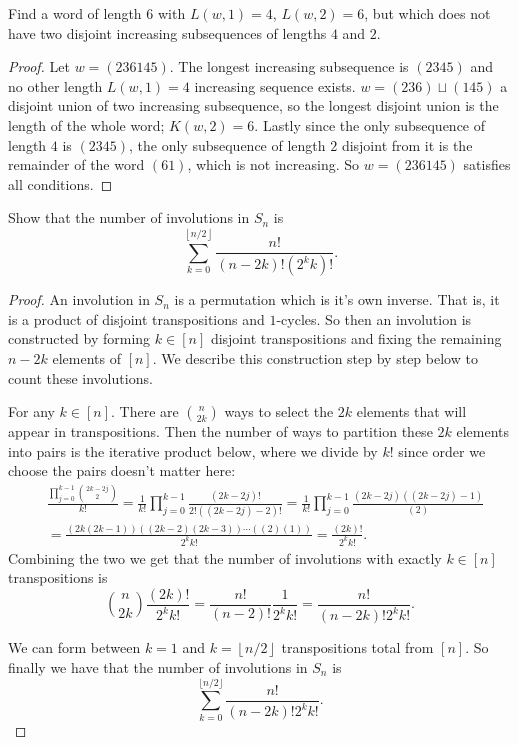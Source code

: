 \documentclass[addpoints,10pt]{exam}
\theoremstyle{plain}
\theoremstyle{definition}
\newtheorem{prob}[thm]{Problem}
\theoremstyle{plain}
\theoremstyle{plain}
\theoremstyle{definition}
\let\oldprob\prob
\let\endoldprob\endprob
\renewenvironment{prob}
  {\begin{singlespace}\oldprob}
  {\endoldprob\end{singlespace}}
\newcommand{\floor}[1]{\left\lfloor #1 \right\rfloor}
\begin{document}
\begin{prob}
Find a word of length $6$ with $L(w,1)=4$, $L(w,2)=6$, but which does not have two disjoint increasing subsequences of lengths $4$ and $2$. 
\end{prob}

\begin{proof}
Let $w=(236145)$. The longest increasing subsequence is $(2345)$ and no other length $L(w,1)=4$ increasing sequence exists. $w=(236)\sqcup(145)$ a disjoint union of two increasing subsequence, so the longest disjoint union is the length of the whole word; $K(w,2)=6$. Lastly since the only subsequence of length $4$ is $(2345)$, the only subsequence of length $2$ disjoint from it is the remainder of the word $(61)$, which is not increasing. So $w=(236145)$ satisfies all conditions.

\end{proof}

\newpage
\setcounter{thm}{5}
\renewcommand{\thethm}{4.\arabic{thm}}

\begin{prob}
  Show that the number of involutions in $S_{n}$ is
  $$\sum_{k=0}^{\floor{n/2}} \frac{n!}{(n-2k)!(2^{k}k)!}.$$
\end{prob}
\begin{proof}
An involution in \(S_n\) is a permutation which is it's own inverse. That is, it is a product of disjoint transpositions and $1$-cycles. So then an involution is constructed by forming \(k\in [n]\) disjoint transpositions and fixing the remaining $n-2k$ elements of $[n].$ We describe this construction step by step below to count these involutions.

For any \(k\in [n]\). There are $\binom{n}{2k}$ ways to select the \(2k\) elements that will appear in transpositions.
Then the number of ways to partition these $2k$ elements into pairs is the iterative product below, where we divide by $k!$ since order we choose the pairs doesn't matter here:
\begin{align*}
&\frac{\prod_{j=0}^{k-1}\binom{2k-2j}{2}}{k!}=\frac{1}{k!}\prod_{j=0}^{k-1}\frac{(2k-2j)!}{2!((2k-2j)-2)!}=\frac{1}{k!}\prod_{j=0}^{k-1}\frac{(2k-2j)((2k-2j)-1)}{(2)}\\
&=\frac{(2k(2k-1))((2k-2)(2k-3))\cdots ((2)(1))}{2^{k}k!}=\frac{(2k)!}{2^{k}k!}.
\end{align*}
Combining the two we get that the number of involutions with exactly $k\in [n]$ transpositions is
\[
\binom{n}{2k}\frac{(2k)!}{2^k k!}
=
\frac{n!}{(n-2)!}\frac{1}{2^k k!}
=
\frac{n!}{(n-2k)!2^k k!}.
\]

We can form between $k=1$ and $k=\floor{n/2}$ transpositions total from $[n]$. So finally we have that the number of involutions in $S_{n}$ is
\[
\sum_{k=0}^{\lfloor n/2\rfloor}
\frac{n!}{(n-2k)!2^k k!}.
\]
\end{proof}
\newpage
\setcounter{thm}{0}
\renewcommand{\thethm}{6.\arabic{thm}}
\end{document}
